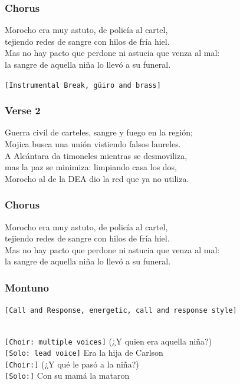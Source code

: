 \subsubsection{Chorus}\label{chorus-39}

Morocho era muy astuto, de policía al cartel,\\
tejiendo redes de sangre con hilos de fría hiel.\\
Mas no hay pacto que perdone ni astucia que venza al mal:\\
la sangre de aquella niña lo llevó a su funeral.

\texttt{{[}Instrumental\ Break,\ güiro\ and\ brass{]}}

\subsubsection{Verse 2}\label{verse-2-15}

Guerra civil de carteles, sangre y fuego en la región;\\
Mojica busca una unión vistiendo falsos laureles.\\
A Alcántara da timoneles mientras se desmoviliza,\\
mas la paz se minimiza: limpiando casa los dos,\\
Morocho al de la DEA dio la red que ya no utiliza.

\subsubsection{Chorus}\label{chorus-40}

Morocho era muy astuto, de policía al cartel,\\
tejiendo redes de sangre con hilos de fría hiel.\\
Mas no hay pacto que perdone ni astucia que venza al mal:\\
la sangre de aquella niña lo llevó a su funeral.

\subsubsection{Montuno}\label{montuno}

\texttt{{[}Call\ and\ Response,\ energetic,\ call\ and\ response\ style{]}}\strut \\
\texttt{{[}Choir:\ multiple\ voices{]}} (¿Y quien era aquella niña?)\\
\texttt{{[}Solo:\ lead\ voice{]}} Era la hija de Carlson\\
\texttt{{[}Choir:{]}} (¿Y qué le pasó a la niña?)\\
\texttt{{[}Solo:{]}} Con su mamá la mataron

